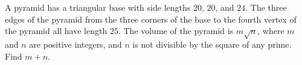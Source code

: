 A pyramid has a triangular base with side lengths $20$,  $20$,  and $24$. The three edges of the pyramid from the three corners of the base to the fourth vertex of the pyramid all have length $25$. The volume of the pyramid is $m\sqrt{n}$,  where $m$ and $n$ are positive integers, and $n$ is not divisible by the square of any prime. Find $m+n$.